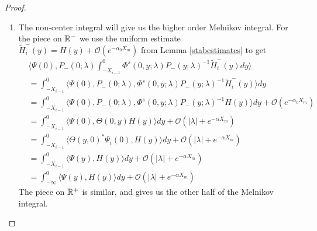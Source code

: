 \documentclass[thesis.tex]{subfiles}
\begin{document}
\begin{lemma}
\begin{proof}
\begin{enumerate}
\item The non-center integral will give us the higher order Melnikov integral. For the piece on $\mathbb{R}^-$ we use the uniform estimate $\tilde{H}_i^-(y) = H(y) + \mathcal{O}(e^{-\alpha_0 X_m})$ from Lemma \ref{stabestimates} to get
\begin{align*}
&\langle \Psi(0), P_-(0; \lambda) \int_{-X_{i-1}}^0 \Phi^s(0, y; \lambda) P_-(y; \lambda)^{-1} \tilde{H}_i^-(y) dy \rangle \\
&= \int_{-X_{i-1}}^0 \langle \Psi(0), P_-(0; \lambda), \Phi^s(0, y; \lambda) P_-(y; \lambda)^{-1} \tilde{H}_i^-(y) \rangle dy \\
&= \int_{-X_{i-1}}^0 \langle \Psi(0), P_-(0; \lambda), \Phi^s(0, y; \lambda) P_-(y; \lambda)^{-1} H(y) \rangle dy + \mathcal{O}({e^{-\alpha_0 X_m}})\\
&= \int_{-X_{i-1}}^0 \langle \Psi(0), \Theta(0, y) H(y) \rangle dy + \mathcal{O}(|\lambda| + {e^{-\alpha X_m}})\\
&= \int_{-X_{i-1}}^0 \langle \Theta(y, 0)^* \Psi_i(0), H(y) \rangle dy + \mathcal{O}(|\lambda| + {e^{-\alpha X_m}})\\
&= \int_{-X_{i-1}}^0 \langle \Psi(y), H(y) \rangle dy + \mathcal{O}(|\lambda| + {e^{-\alpha X_m}})\\
&= \int_{-\infty}^0 \langle \Psi(y), H(y) \rangle dy + \mathcal{O}(|\lambda| + {e^{-\alpha X_m}})
\end{align*}
The piece on $\mathbb{R}^+$ is similar, and gives us the other half of the Melnikov integral.


\end{enumerate}
\end{proof}
\end{lemma}
\end{document}
